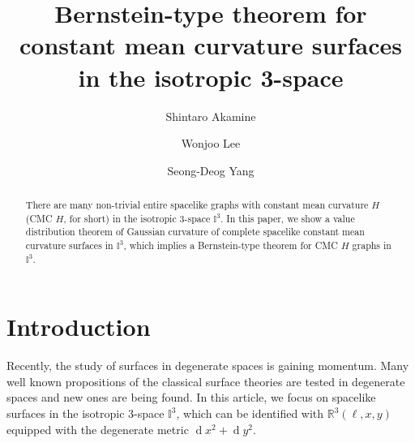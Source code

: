 \documentclass[12pt,a4paper,reqno]{amsart}
\theoremstyle{plain} %
\theoremstyle{definition}
\begin{document}
\title[Bernstein-type theorem for CMC surfaces in $\mathbb{I}^3$]
{Bernstein-type theorem for constant mean curvature surfaces in the isotropic 3-space}

\author[S.Akamine]{Shintaro Akamine}
\address{Shintaro Akamine \\
College of Bioresource Sciences \\ Nihon University \\ 1866 Kameino, Fujisawa, Kanagawa, 252-0880, Japan}

\author[W.Lee]{Wonjoo Lee}
\address{Wonjoo Lee \\ Department of Mathematics \\ Jeonbuk National University \\ 567 Baekje-daero, Deokjin-gu, Jeonju-si, Jeonbuk-do 54896, Republic of Korea}

\author[S-D.Yang]{Seong-Deog Yang}
\address{Seong-Deog Yang \\ Department of Mathematics \\ Korea University \\ 145 Anam-ro, Seongbuk-gu, Seoul 02841, Republic of Korea}



\begin{abstract}
There are many non-trivial entire spacelike graphs with constant mean curvature $H$ (CMC $H$, for short) in the isotropic 3-space $\mathbb{I}^3$. In this paper, we show a value distribution theorem of Gaussian curvature of complete spacelike  constant mean curvature surfaces in $\mathbb{I}^3$, which implies a Bernstein-type theorem for CMC $H$ graphs in $\mathbb{I}^3$.
\end{abstract}

\maketitle


\section{Introduction}

Recently, the study of surfaces in degenerate spaces is gaining momentum. Many well known propositions of the classical surface theories are tested in degenerate spaces and new ones are being found. In this article, we focus on spacelike surfaces in the isotropic $3$-space $\mathbb{I}^3$, which can be identified with $\mathbb{R}^3(\ell, x, y)$ equipped with the degenerate metric $\operatorname{d}\!x^2+\operatorname{d}\!y^2$. 
\end{document}
